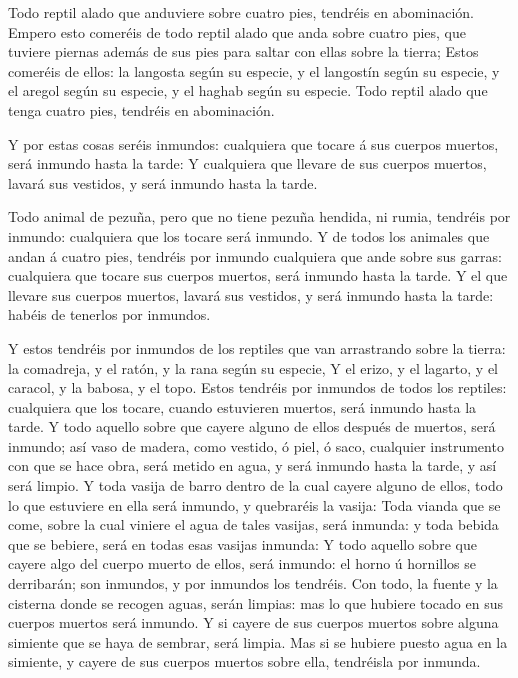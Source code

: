  Todo reptil alado que anduviere sobre cuatro pies,
tendréis en abominación.  Empero esto comeréis de todo
reptil alado que anda sobre cuatro pies, que tuviere piernas además de
sus pies para saltar con ellas sobre la tierra;  Estos
comeréis de ellos: la langosta según su especie, y el langostín según su
especie, y el aregol según su especie, y el haghab según su especie.
 Todo reptil alado que tenga cuatro pies, tendréis en
abominación.

 Y por estas cosas seréis inmundos: cualquiera que tocare á
sus cuerpos muertos, será inmundo hasta la tarde:  Y
cualquiera que llevare de sus cuerpos muertos, lavará sus vestidos, y
será inmundo hasta la tarde.

 Todo animal de pezuña, pero que no tiene pezuña hendida,
ni rumia, tendréis por inmundo: cualquiera que los tocare será inmundo.
 Y de todos los animales que andan á cuatro pies, tendréis
por inmundo cualquiera que ande sobre sus garras: cualquiera que tocare
sus cuerpos muertos, será inmundo hasta la tarde.  Y el que
llevare sus cuerpos muertos, lavará sus vestidos, y será inmundo hasta
la tarde: habéis de tenerlos por inmundos.

 Y estos tendréis por inmundos de los reptiles que van
arrastrando sobre la tierra: la comadreja, y el ratón, y la rana según
su especie,  Y el erizo, y el lagarto, y el caracol, y la
babosa, y el topo.  Estos tendréis por inmundos de todos
los reptiles: cualquiera que los tocare, cuando estuvieren muertos, será
inmundo hasta la tarde.  Y todo aquello sobre que cayere
alguno de ellos después de muertos, será inmundo; así vaso de madera,
como vestido, ó piel, ó saco, cualquier instrumento con que se hace
obra, será metido en agua, y será inmundo hasta la tarde, y así será
limpio.  Y toda vasija de barro dentro de la cual cayere
alguno de ellos, todo lo que estuviere en ella será inmundo, y
quebraréis la vasija:  Toda vianda que se come, sobre la
cual viniere el agua de tales vasijas, será inmunda: y toda bebida que
se bebiere, será en todas esas vasijas inmunda:  Y todo
aquello sobre que cayere algo del cuerpo muerto de ellos, será inmundo:
el horno ú hornillos se derribarán; son inmundos, y por inmundos los
tendréis.  Con todo, la fuente y la cisterna donde se
recogen aguas, serán limpias: mas lo que hubiere tocado en sus cuerpos
muertos será inmundo.  Y si cayere de sus cuerpos muertos
sobre alguna simiente que se haya de sembrar, será limpia. 
Mas si se hubiere puesto agua en la simiente, y cayere de sus cuerpos
muertos sobre ella, tendréisla por inmunda.


